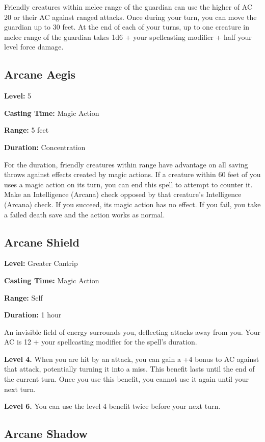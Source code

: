 \documentclass[12pt,letterpaper,twocolumn,openany,nodeprecatedcode,bg=none]{dndbook}
\begin{document}
Friendly creatures within melee range of the guardian can use the higher
of AC 20 or their AC against ranged attacks. Once during your turn, you
can move the guardian up to 30 feet. At the end of each of your turns,
up to one creature in melee range of the guardian takes 1d6 + your
spellcasting modifier + half your level force damage.

\subsection{Arcane Aegis}\label{arcane-aegis}

\textbf{Level:} 5

\textbf{Casting Time:} Magic Action

\textbf{Range:} 5 feet

\textbf{Duration:} Concentration

For the duration, friendly creatures within range have advantage on all
saving throws against effects created by magic actions. If a creature
within 60 feet of you uses a magic action on its turn, you can end this
spell to attempt to counter it. Make an Intelligence (Arcana) check
opposed by that creature's Intelligence (Arcana) check. If you succeed,
its magic action has no effect. If you fail, you take a failed death
save and the action works as normal.

\subsection{Arcane Shield}\label{arcane-shield}

\textbf{Level:} Greater Cantrip

\textbf{Casting Time:} Magic Action

\textbf{Range:} Self

\textbf{Duration:} 1 hour

An invisible field of energy surrounds you, deflecting attacks away from
you. Your AC is 12 + your spellcasting modifier for the spell's
duration.

\textbf{Level 4.} When you are hit by an attack, you can gain a +4 bonus
to AC against that attack, potentially turning it into a miss. This
benefit lasts until the end of the current turn. Once you use this
benefit, you cannot use it again until your next turn.

\textbf{Level 6.} You can use the level 4 benefit twice before your next
turn.

\subsection{Arcane Shadow}\label{arcane-shadow}
\end{document}
